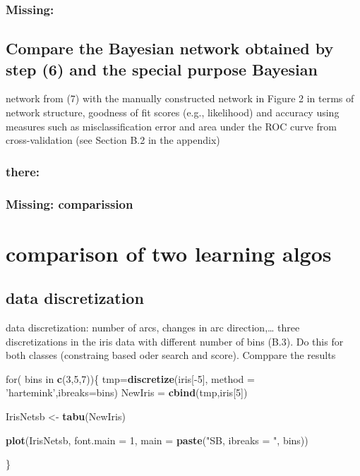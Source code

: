 \documentclass[]{article}
\newenvironment{Shaded}{\begin{snugshade}}{\end{snugshade}}
\newcommand{\KeywordTok}[1]{\textcolor[rgb]{0.13,0.29,0.53}{\textbf{{#1}}}}
\newcommand{\DataTypeTok}[1]{\textcolor[rgb]{0.13,0.29,0.53}{{#1}}}
\newcommand{\DecValTok}[1]{\textcolor[rgb]{0.00,0.00,0.81}{{#1}}}
\newcommand{\StringTok}[1]{\textcolor[rgb]{0.31,0.60,0.02}{{#1}}}
\newcommand{\NormalTok}[1]{{#1}}
\begin{document}
\subsubsection{Missing:}\label{missing-1}

\subsection{Compare the Bayesian network obtained by step (6) and the
special purpose
Bayesian}\label{compare-the-bayesian-network-obtained-by-step-6-and-the-special-purpose-bayesian}

network from (7) with the manually constructed network in Figure 2 in
terms of network structure, goodness of fit scores (e.g., likelihood)
and accuracy using measures such as misclassification error and area
under the ROC curve from cross-validation (see Section B.2 in the
appendix)

\subsubsection{there:}\label{there}

\subsubsection{Missing: comparission}\label{missing-comparission}

\section{comparison of two learning
algos}\label{comparison-of-two-learning-algos}

\subsection{data discretization}\label{data-discretization}

data discretization: number of arcs, changes in arc direction,\ldots{}
three discretizations in the iris data with different number of bins
(B.3). Do this for both classes (constraing based oder search and
score). Comppare the results

\begin{Shaded}
\begin{Highlighting}[]
\NormalTok{for( bins in }\KeywordTok{c}\NormalTok{(}\DecValTok{3}\NormalTok{,}\DecValTok{5}\NormalTok{,}\DecValTok{7}\NormalTok{))\{}
\NormalTok{tmp=}\KeywordTok{discretize}\NormalTok{(iris[-}\DecValTok{5}\NormalTok{], }\DataTypeTok{method =} \StringTok{'hartemink'}\NormalTok{,}\DataTypeTok{ibreaks=}\NormalTok{bins) }
\NormalTok{NewIris =}\StringTok{ }\KeywordTok{cbind}\NormalTok{(tmp,iris[}\DecValTok{5}\NormalTok{]) }

\NormalTok{IrisNetsb <-}\StringTok{ }\KeywordTok{tabu}\NormalTok{(NewIris)}

\KeywordTok{plot}\NormalTok{(IrisNetsb, }\DataTypeTok{font.main =} \DecValTok{1}\NormalTok{, }\DataTypeTok{main =} \KeywordTok{paste}\NormalTok{(}\StringTok{"SB, ibreaks = "}\NormalTok{, bins))}

\NormalTok{\}}
\end{Highlighting}
\end{Shaded}
\end{document}
